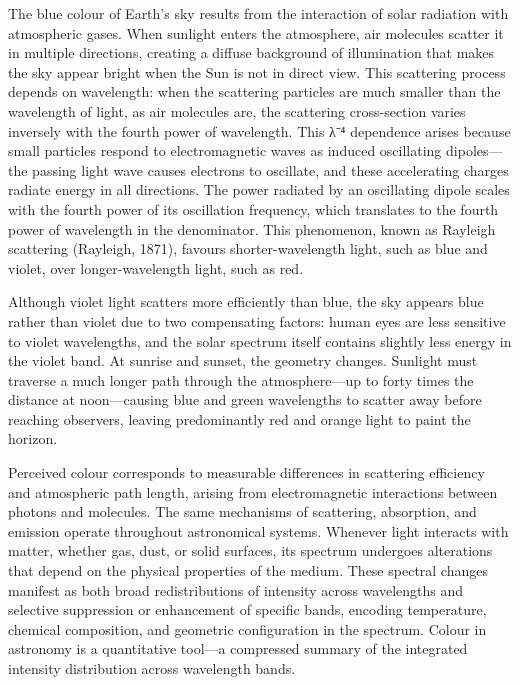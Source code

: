 The blue colour of Earth's sky results from the interaction of solar radiation with atmospheric gases. When sunlight enters the atmosphere, air molecules scatter it in multiple directions, creating a diffuse background of illumination that makes the sky appear bright when the Sun is not in direct view. This scattering process depends on wavelength: when the scattering particles are much smaller than the wavelength of light, as air molecules are, the scattering cross-section varies inversely with the fourth power of wavelength. This λ⁻⁴ dependence arises because small particles respond to electromagnetic waves as induced oscillating dipoles—the passing light wave causes electrons to oscillate, and these accelerating charges radiate energy in all directions. The power radiated by an oscillating dipole scales with the fourth power of its oscillation frequency, which translates to the fourth power of wavelength in the denominator. This phenomenon, known as Rayleigh scattering (Rayleigh, 1871), favours shorter-wavelength light, such as blue and violet, over longer-wavelength light, such as red.

Although violet light scatters more efficiently than blue, the sky appears blue rather than violet due to two compensating factors: human eyes are less sensitive to violet wavelengths, and the solar spectrum itself contains slightly less energy in the violet band. At sunrise and sunset, the geometry changes. Sunlight must traverse a much longer path through the atmosphere—up to forty times the distance at noon—causing blue and green wavelengths to scatter away before reaching observers, leaving predominantly red and orange light to paint the horizon.

Perceived colour corresponds to measurable differences in scattering efficiency and atmospheric path length, arising from electromagnetic interactions between photons and molecules. The same mechanisms of scattering, absorption, and emission operate throughout astronomical systems. Whenever light interacts with matter, whether gas, dust, or solid surfaces, its spectrum undergoes alterations that depend on the physical properties of the medium. These spectral changes manifest as both broad redistributions of intensity across wavelengths and selective suppression or enhancement of specific bands, encoding temperature, chemical composition, and geometric configuration in the spectrum. Colour in astronomy is a quantitative tool—a compressed summary of the integrated intensity distribution across wavelength bands.

